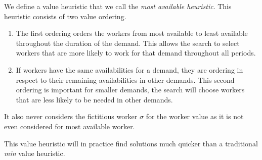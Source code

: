 \documentclass[../../thesis.tex]{subfiles}
\begin{document}
We define a value heuristic that we call the \emph{most available heuristic}. 
This heuristic consists of two value ordering.
\begin{enumerate}
  \item The first ordering orders the workers from most available to least available throughout the duration of the demand.
        This allows the search to select workers that are more likely to work for that demand throughout all periods.
  \item If workers have the same availabilities for a demand, they are ordering in respect to their remaining availabilities in other demands. This 
        second ordering is important for smaller demands, the search will choose workers that are less likely to be needed in other demands.
\end{enumerate}

It also never considers the fictitious worker $\sigma$ for the worker value as it is not even considered 
for most available worker.

This value heuristic will in practice find solutions much quicker than a traditional \emph{min} value heuristic.
\end{document}
